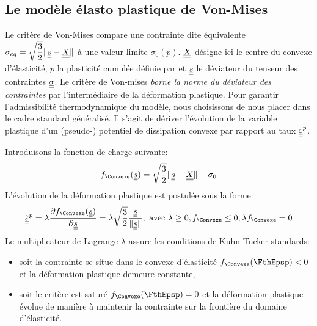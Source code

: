 \documentclass[10pt]{book}
\begin{document}
\begin{appendices}
\subsection{Le modèle élasto plastique de Von-Mises}
Le critère de Von-Mises compare une contrainte dite \og équivalente \fg{} $\sigma_{eq}=\sqrt{\dfrac{3}{2}}\Vert \underline{\underline{s}}-\underline{\underline{X}}\Vert$ à une valeur limite $\sigma_{0}(p)$. $\underline{\underline{X}}$ désigne ici le centre du convexe d'élasticité, $p$ la plasticité cumulée définie par et $\underline{\underline{s}}$ le déviateur du tenseur des contraintes $\underline{\underline{\sigma}}$. Le critère de Von-mises \emph{borne la norme du déviateur des contraintes} \cite{maitournam2017materiaux} par l'intermédiaire de la déformation plastique. Pour garantir l'admissibilité thermodynamique du modèle, nous choisissons de nous placer dans le cadre standard généralisé. Il s'agit de dériver l'évolution de la variable plastique d'un (pseudo-) potentiel de dissipation convexe par rapport au taux $\dot{\underline{\underline{\varepsilon}}}^{p}$.

Introduisons la fonction de charge suivante:
$$\FChargeConvexe(\devia)=\sqrt{\frac{3}{2}}\Vert \devia-\ten{X}\Vert-\sigma_{0}$$
L'évolution de la déformation plastique est postulée sous la forme:
\begin{equation}
\dot{\DefoHPP}^{p}=\lambda\dfrac{\partial\FChargeConvexe(\devia)}{\partial\devia}=\lambda\sqrt{\dfrac{3}{2}}\dfrac{\devia}{\Vert \devia\Vert}, \avec \lambda\geq 0, \FChargeConvexe\leq 0, \lambda \FChargeConvexe=0
\label{eq:evolution variable_interne}
\end{equation}
Le multiplicateur de Lagrange $\lambda$ assure les conditions de Kuhn-Tucker standards:
\begin{itemize}
\item soit la contrainte se situe dans le convexe d'élasticité $\FChargeConvexe(\FthEpsp)< 0$ et la déformation plastique demeure constante,
\item soit le critère est saturé $\FChargeConvexe(\FthEpsp)=0$ et la déformation plastique évolue de manière à maintenir la contrainte sur la frontière du domaine d'élasticité.
\end{itemize}

\end{appendices}
\end{document}
